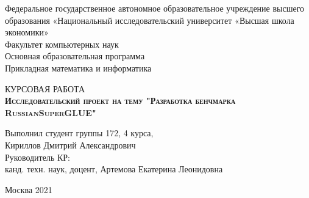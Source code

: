\begin{titlepage}
    \newpage
    
    {
        \begin{center}
            Федеральное государственное автономное образовательное учреждение высшего образования «Национальный исследовательский университет «Высшая школа экономики»
            \\
            \bigskip
            Факультет компьютерных наук \\
            Основная образовательная программа \\
            Прикладная математика и информатика \\
        \end{center}
    }
    
    \vspace{8em}
    
    \begin{center}
        {\Large КУРСОВАЯ РАБОТА}\\
        \textsc{\textbf{
                Исследовательский проект на тему
                \linebreak
                "Разработка бенчмарка RussianSuperGLUE"}}
    \end{center}
    
    \vspace{2em}
    
    {
        \hfill\parbox{16cm}{
            \hspace*{5cm}\hspace*{-5cm}Выполнил студент группы 172, 4 курса,\\
            Кириллов Дмитрий Александрович\\
            
            \hspace*{5cm}\hspace*{-5cm}Руководитель КР:\\
            канд. техн. наук, доцент, Артемова Екатерина Леонидовна\\
            
            
        }
    }
    
    \vspace{\fill}
    
    \begin{center}
        Москва 2021
    \end{center}
    
\end{titlepage}